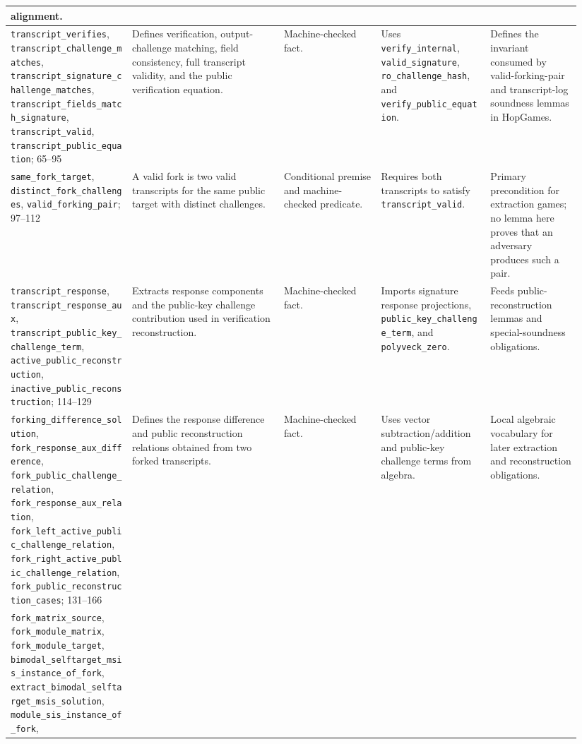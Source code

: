 \documentclass[11pt]{report}
\DeclareRobustCommand{\ec}[1]{\ifmmode\text{\nolinkurl{#1}}\else\nolinkurl{#1}\fi}
\theoremstyle{definition}
\theoremstyle{plain}
\begin{document}
\begin{longtable}{p{0.20\linewidth}p{0.25\linewidth}p{0.16\linewidth}p{0.18\linewidth}p{0.15\linewidth}}
alignment. \\
\midrule
\ec{transcript\_verifies}, \ec{transcript\_challenge\_matches},
\ec{transcript\_signature\_challenge\_matches},
\ec{transcript\_fields\_match\_signature}, \ec{transcript\_valid},
\ec{transcript\_public\_equation}; 65--95 &
Defines verification, output-challenge matching, field consistency, full
transcript validity, and the public verification equation. &
Machine-checked fact. &
Uses \ec{verify\_internal}, \ec{valid\_signature},
\ec{ro\_challenge\_hash}, and \ec{verify\_public\_equation}. &
Defines the invariant consumed by valid-forking-pair and transcript-log soundness
lemmas in HopGames. \\
\midrule
\ec{same\_fork\_target}, \ec{distinct\_fork\_challenges},
\ec{valid\_forking\_pair}; 97--112 &
A valid fork is two valid transcripts for the same public target with distinct
challenges. &
Conditional premise and machine-checked predicate. &
Requires both transcripts to satisfy \ec{transcript\_valid}. &
Primary precondition for extraction games; no lemma here proves that an
adversary produces such a pair. \\
\midrule
\ec{transcript\_response}, \ec{transcript\_response\_aux},
\ec{transcript\_public\_key\_challenge\_term},
\ec{active\_public\_reconstruction},
\ec{inactive\_public\_reconstruction}; 114--129 &
Extracts response components and the public-key challenge contribution used in
verification reconstruction. &
Machine-checked fact. &
Imports signature response projections, \ec{public\_key\_challenge\_term},
and \ec{polyveck\_zero}. &
Feeds public-reconstruction lemmas and special-soundness obligations. \\
\midrule
\ec{forking\_difference\_solution},
\ec{fork\_response\_aux\_difference},
\ec{fork\_public\_challenge\_relation},
\ec{fork\_response\_aux\_relation},
\ec{fork\_left\_active\_public\_challenge\_relation},
\ec{fork\_right\_active\_public\_challenge\_relation},
\ec{fork\_public\_reconstruction\_cases}; 131--166 &
Defines the response difference and public reconstruction relations obtained
from two forked transcripts. &
Machine-checked fact. &
Uses vector subtraction/addition and public-key challenge terms from algebra. &
Local algebraic vocabulary for later extraction and reconstruction obligations. \\
\midrule
\ec{fork\_matrix\_source}, \ec{fork\_module\_matrix},
\ec{fork\_module\_target},
\ec{bimodal\_selftarget\_msis\_instance\_of\_fork},
\ec{extract\_bimodal\_selftarget\_msis\_solution},
\ec{module\_sis\_instance\_of\_fork},

\end{longtable}
\end{document}
